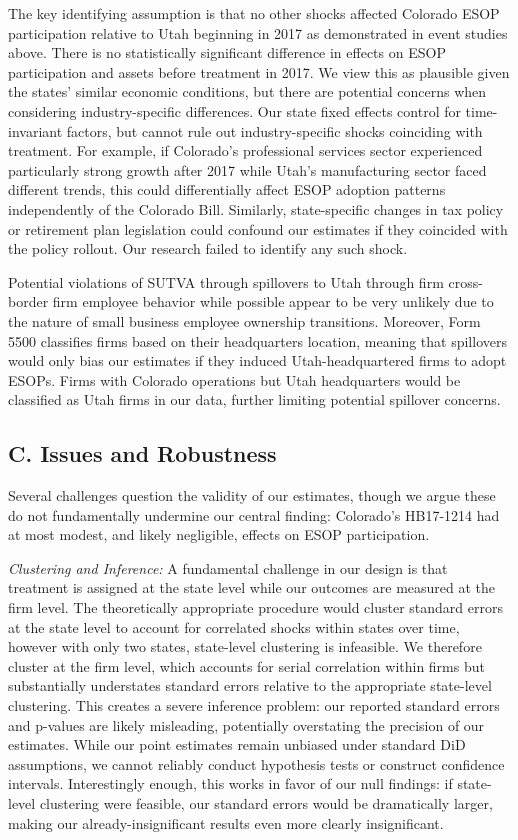 \documentclass[12pt]{article}
\begin{document}
The key identifying assumption is that no other shocks affected Colorado ESOP participation relative to Utah beginning in 2017 as demonstrated in event studies above. There is no statistically significant difference in effects on ESOP participation and assets before treatment in 2017. We view this as plausible given the states' similar economic conditions, but there are potential concerns when considering industry-specific differences. Our state fixed effects control for time-invariant factors, but cannot rule out industry-specific shocks coinciding with treatment. For example, if Colorado's professional services sector experienced particularly strong growth after 2017 while Utah's manufacturing sector faced different trends, this could differentially affect ESOP adoption patterns independently of the Colorado Bill. Similarly, state-specific changes in tax policy or retirement plan legislation could confound our estimates if they coincided with the policy rollout. Our research failed to identify any such shock.

Potential violations of SUTVA through spillovers to Utah through firm cross-border firm employee behavior while possible appear to be very unlikely due to the nature of small business employee ownership transitions. Moreover, Form 5500 classifies firms based on their headquarters location, meaning that spillovers would only bias our estimates if they induced Utah-headquartered firms to adopt ESOPs. Firms with Colorado operations but Utah headquarters would be classified as Utah firms in our data, further limiting potential spillover concerns.

\subsection*{C. Issues and Robustness}

Several challenges question the validity of our estimates, though we argue these do not fundamentally undermine our central finding: Colorado's HB17-1214 had at most modest, and likely negligible, effects on ESOP participation.

\textit{Clustering and Inference:} A fundamental challenge in our design is that treatment is assigned at the state level while our outcomes are measured at the firm level. The theoretically appropriate procedure would cluster standard errors at the state level to account for correlated shocks within states over time, however with only two states, state-level clustering is infeasible. We therefore cluster at the firm level, which accounts for serial correlation within firms but substantially understates standard errors relative to the appropriate state-level clustering. This creates a severe inference problem: our reported standard errors and p-values are likely misleading, potentially overstating the precision of our estimates. While our point estimates remain unbiased under standard DiD assumptions, we cannot reliably conduct hypothesis tests or construct confidence intervals. Interestingly enough, this works in favor of our null findings: if state-level clustering were feasible, our standard errors would be dramatically larger, making our already-insignificant results even more clearly insignificant.
\end{document}

